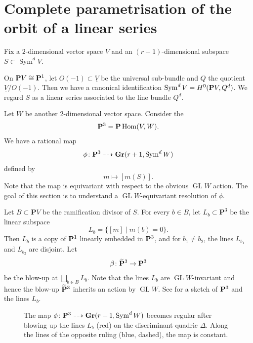\documentclass[11pt]{amsart}
\renewcommand {\P}{{\bf P}}
\providecommand {\Gr}{{\bf Gr}}
\providecommand{\GL}{\operatorname{GL}}
\providecommand{\Hom}{\operatorname{Hom}}
\providecommand{\Sym}{\operatorname{Sym}}
\begin{document}
\section{Complete parametrisation of the orbit of a linear series}\label{sec:res}
Fix a \(2\)-dimensional vector space \(V\) and an \((r+1)\)-dimensional subspace \(S \subset \Sym^{d}V\).

On \(\P V \cong \P^1\), let \(O(-1) \subset \underline V\) be the universal sub-bundle and \(Q\) the quotient \(\underline V / O(-1)\).
Then we have a canonical identification \(\Sym^d V = H^0(\P V, Q^d)\).
We regard \(S\) as a linear series associated to the line bundle \(Q^d\).

Let \(W\) be another \(2\)-dimensional vector space.
Consider the 
\[ \P^{3} = \P \Hom(V,W).\]
We have a rational map
\[ \phi \colon \mathbf{P}^3 \dashrightarrow \Gr(r+1, \Sym^{d}W)\]
defined by
\begin{equation}\label{eq:mmap}
  m \mapsto [m(S)].
\end{equation}
Note that the map is equivariant with respect to the obvious \(\GL W\) action.
The goal of this section is to understand a \(\GL W\)-equivariant resolution of \(\phi\).

Let \(B \subset \mathbf{P} V\) be the ramification divisor of \(S\).
For every \(b \in B\), let \(L_{b} \subset \mathbf{P}^{3}\) be the linear subspace
\begin{equation}\label{eq:lb}
  L_{b} = \{[m] \mid m(b) = 0\}.
\end{equation}
Then \(L_{b}\) is a copy of  \(\P^{1}\) linearly embedded in \(\P^3\), and for \(b_{1} \neq b_{2}\), the lines \(L_{b_1}\) and \(L_{b_2}\) are disjoint.
Let
\[ \beta \colon \widetilde {\P}^{3} \to \P^{3}\]
be the blow-up at \(\bigsqcup_{b \in B} L_{b}\).
Note that the lines \(L_{b}\) are \(\GL W\)-invariant and hence the blow-up \(\widetilde{\P}^{3}\) inherits an action by \(\GL W\).
See  for a sketch of \(\P^3\) and the lines \(L_b\).

\begin{figure}
  \centering
  \caption{
    The map \(\phi \colon \P^3 \dashrightarrow \Gr(r+1,\Sym^d W)\) becomes regular after blowing up the lines \(L_b\) (red) on the discriminant quadric \(\Delta\).
    Along the lines of the opposite ruling (blue, dashed), the map is constant.    
  }\label{fig:blowup}
\end{figure}
\end{document}
